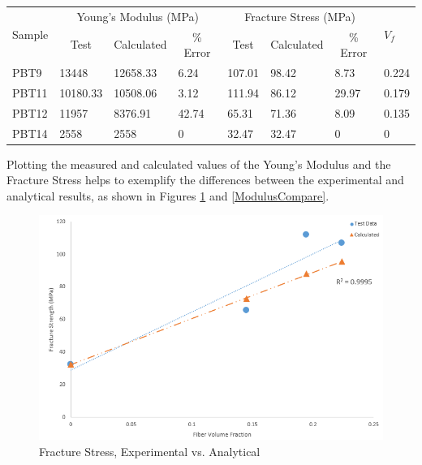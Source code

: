 \documentclass[11pt]{article}
\begin{document}
\onehalfspacing
\begin{center}
 \label{tab:ComparingValues}
\begin{tabular}{p{1.25cm} || p{1.5cm} | p{1.5cm} | p{1.5cm} | p{1.5cm} | p{1.5cm} | p{1.5cm} | p{1cm}}
\hline
 \multirow{2}{*}{Sample} & \multicolumn{3}{c|}{Young's Modulus (MPa)}  & 
   \multicolumn{3}{c|}{Fracture Stress (MPa)} & \multirow{2}{*}{\(V_f\)} \\
   & \multicolumn{1}{c}{Test} & \multicolumn{1}{c}{Calculated} & \multicolumn{1}{c|}{\% Error} & \multicolumn{1}{c}{Test} & \multicolumn{1}{c}{Calculated} & \multicolumn{1}{c|}{\% Error} &\\
\hline
PBT9 & 13448 & 12658.33 & 6.24 & 107.01 & 98.42 & 8.73 & 0.224\\
PBT11 & 10180.33 & 10508.06 & 3.12 & 111.94 & 86.12 & 29.97 & 0.179\\
PBT12 & 11957 & 8376.91 & 42.74 & 65.31 & 71.36 & 8.09 & 0.135 \\
PBT14 & 2558 & 2558 & 0 & 32.47 & 32.47 & 0 & 0\\
\hline
\end{tabular}
\end{center}
\singlespacing

Plotting the measured and calculated values of the Young's Modulus and the Fracture Stress helps to exemplify the differences between the experimental and analytical results, as shown in Figures \ref{FScompare} and \ref{ModulusCompare}.

\begin{figure}[H]
\centering
\includegraphics[width=.95\linewidth]{figures/fracture_stress_test_vs_calc.png}
\caption{Fracture Stress, Experimental vs. Analytical}
\label{FScompare}
\end{figure}
\end{document}
